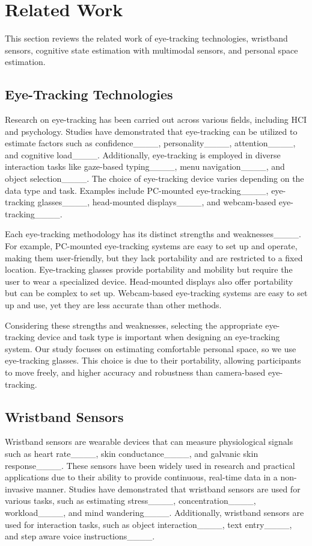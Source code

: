 \section{Related Work}
This section reviews the related work of eye-tracking technologies, wristband sensors, cognitive state estimation with multimodal sensors, and personal space estimation.

\subsection{Eye-Tracking Technologies}
Research on eye-tracking has been carried out across various fields, including HCI and psychology. 
Studies have demonstrated that eye-tracking can be utilized to estimate factors such as confidence____, personality____, attention____, and cognitive load____. 
Additionally, eye-tracking is employed in diverse interaction tasks like gaze-based typing____, menu navigation____, and object selection____.
The choice of eye-tracking device varies depending on the data type and task. 
Examples include PC-mounted eye-tracking____, eye-tracking glasses____, head-mounted displays____, and webcam-based eye-tracking____.

Each eye-tracking methodology has its distinct strengths and weaknesses____.
For example, PC-mounted eye-tracking systems are easy to set up and operate, making them user-friendly, but they lack portability and are restricted to a fixed location. 
Eye-tracking glasses provide portability and mobility but require the user to wear a specialized device. Head-mounted displays also offer portability but can be complex to set up. 
Webcam-based eye-tracking systems are easy to set up and use, yet they are less accurate than other methods.

Considering these strengths and weaknesses, selecting the appropriate eye-tracking device and task type is important when designing an eye-tracking system.
Our study focuses on estimating comfortable personal space, so we use eye-tracking glasses. 
This choice is due to their portability, allowing participants to move freely, and higher accuracy and robustness than camera-based eye-tracking.

\subsection{Wristband Sensors}
Wristband sensors are wearable devices that can measure physiological signals such as heart rate____, skin conductance____, and galvanic skin response____.
These sensors have been widely used in research and practical applications due to their ability to provide continuous, real-time data in a non-invasive manner. 
Studies have demonstrated that wristband sensors are used for various tasks, such as estimating stress____, concentration____, workload____, and mind wandering____.
Additionally, wristband sensors are used for interaction tasks, such as object interaction____, text entry____, and step aware voice instructions____.

